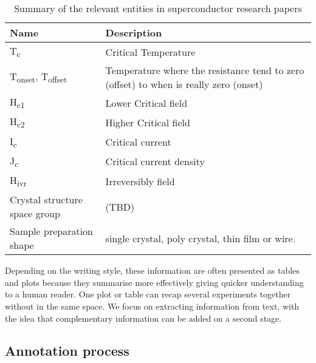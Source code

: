 \documentclass[a4paper,10pt]{article}
\begin{document}
\begin{table}[h!]
    \centering
    \begin{tabular}{ | m{5em} | m{8cm}| } 
    \hline
        Name & Description  \\ [0.5ex] 
    \hline\hline
        T\textsubscript{c} & Critical Temperature\\ 
    \hline
        T\textsubscript{onset}, T\textsubscript{offset} & Temperature where the resistance tend to zero (offset) to when is really zero (onset)\\ 
    \hline
        H\textsubscript{c1} & Lower Critical field\\ 
    \hline
        H\textsubscript{c2} & Higher Critical field\\ 
    \hline
        I\textsubscript{c} & Critical current\\
    \hline
        J\textsubscript{c} & Critical current density\\ 
    \hline
        H\textsubscript{ivr} & Irreversibly field\\
    \hline
        Crystal structure space group & (TBD) \\
    \hline
        Sample preparation shape & single crystal, poly crystal, thin film or wire. \\
    \hline    
    \end{tabular}
    \caption{Summary of the relevant entities in superconductor research papers}
    \label{table:summary-entities-superconductor}
\end{table}

Depending on the writing style, these information are often presented as tables and plots because they summarise more effectively giving quicker understanding to a human reader. One plot or table can recap several experiments together without in the same space. 
We focus on extracting information from text, with the idea that complementary information can be added on a second stage. 

\subsection{Annotation process}
\label{sec:annotation-process}

\end{document}
